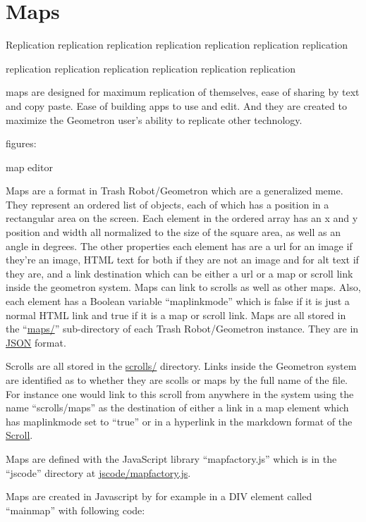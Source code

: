 
\section{Maps}\label{maps}

Replication replication replication replication replication replication replication

replication replication replication replication replication replication

maps are designed for maximum replication of themselves, ease of sharing by text and copy paste. Ease of building apps to use and edit.  And they are created to maximize the Geometron user's ability to replicate other technology.  

figures:

map editor


Maps are a format in Trash Robot/Geometron which are a generalized meme.
They represent an ordered list of objects, each of which has a position
in a rectangular area on the screen. Each element in the ordered array
has an x and y position and width all normalized to the size of the
square area, as well as an angle in degrees. The other properties each
element has are a url for an image if they're an image, HTML text for
both if they are not an image and for alt text if they are, and a link
destination which can be either a url or a map or scroll link inside the
geometron system. Maps can link to scrolls as well as other maps. Also,
each element has a Boolean variable ``maplinkmode'' which is false if it
is just a normal HTML link and true if it is a map or scroll link. Maps
are all stored in the ``\url{maps/}'' sub-directory of each Trash
Robot/Geometron instance. They are in
\href{https://www.json.org/json-en.html}{JSON} format.

Scrolls are all stored in the \url{scrolls/} directory. Links inside the
Geometron system are identified as to whether they are scolls or maps by
the full name of the file. For instance one would link to this scroll
from anywhere in the system using the name ``scrolls/maps'' as the
destination of either a link in a map element which has maplinkmode set
to ``true'' or in a hyperlink in the markdown format of the
\href{scrolls/scrolls}{Scroll}.

Maps are defined with the JavaScript library ``mapfactory.js'' which is
in the ``jscode'' directory at \url{jscode/mapfactory.js}.

Maps are created in Javascript by for example in a DIV element called
``mainmap'' with following code:

